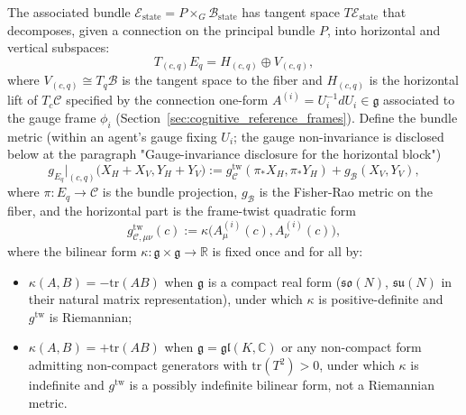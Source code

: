 \documentclass[11pt]{article}
\begin{document}
The associated bundle $\mathcal{E}_{\mathrm{state}} = P \times_G \mathcal{B}_{\mathrm{state}}$ has tangent space $T\mathcal{E}_{\mathrm{state}}$ that decomposes, given a connection on the principal bundle $P$, into horizontal and vertical subspaces:
\begin{equation}
T_{(c, q)} E_q = H_{(c, q)} \oplus V_{(c, q)},
\end{equation}
where $V_{(c, q)} \cong T_q \mathcal{B}$ is the tangent space to the fiber and $H_{(c, q)}$ is the horizontal lift of $T_c \mathcal{C}$ specified by the connection one-form $A^{(i)} = U_i^{-1}dU_i \in \mathfrak{g}$ associated to the gauge frame $\phi_i$ (Section~\ref{sec:cognitive_reference_frames}). Define the bundle metric (within an agent's gauge fixing $U_i$; the gauge non-invariance is disclosed below at the paragraph "Gauge-invariance disclosure for the horizontal block")
\begin{equation}
g_{E_q}\big|_{(c, q)}\big(X_H + X_V, Y_H + Y_V\big) := g_{\mathcal{C}}^{\mathrm{tw}}(\pi_* X_H, \pi_* Y_H) + g_{\mathcal{B}}(X_V, Y_V),
\label{eq:bundle_metric}
\end{equation}
where $\pi: E_q \to \mathcal{C}$ is the bundle projection, $g_{\mathcal{B}}$ is the Fisher-Rao metric on the fiber, and the horizontal part is the frame-twist quadratic form
\begin{equation}
g_{\mathcal{C},\mu\nu}^{\mathrm{tw}}(c) := \kappa\big(A^{(i)}_\mu(c), A^{(i)}_\nu(c)\big),
\label{eq:horizontal_metric}
\end{equation}
where the bilinear form $\kappa: \mathfrak{g} \times \mathfrak{g} \to \mathbb{R}$ is fixed once and for all by:
\begin{itemize}
\item $\kappa(A, B) = -\mathrm{tr}(AB)$ when $\mathfrak{g}$ is a compact real form ($\mathfrak{so}(N)$, $\mathfrak{su}(N)$ in their natural matrix representation), under which $\kappa$ is positive-definite and $g^{\mathrm{tw}}$ is Riemannian;
\item $\kappa(A, B) = +\mathrm{tr}(AB)$ when $\mathfrak{g} = \mathfrak{gl}(K, \mathbb{C})$ or any non-compact form admitting non-compact generators with $\mathrm{tr}(T^2) > 0$, under which $\kappa$ is indefinite and $g^{\mathrm{tw}}$ is a possibly indefinite bilinear form, not a Riemannian metric.
\end{itemize}
\end{document}
